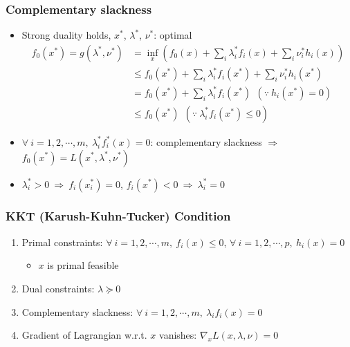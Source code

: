 \subsubsection*{Complementary slackness}
\begin{itemize}
    \item Strong duality holds, $x^\ast$, $\lambda^\ast$, $\nu^\ast$: optimal
    \begin{equation}\begin{aligned}
        f_0(x^\ast)=g(\lambda^\ast,\nu^\ast) &= \inf_{x} \left(f_0(x)+\sum_{i}\lambda_i^\ast f_i(x)+\sum_i \nu_i^\ast h_i(x)\right) \\
            &\leq f_0(x^\ast)+\sum_{i}\lambda_i^\ast f_i(x^\ast)+\sum_i \nu_i^\ast h_i(x^\ast) \\
            &= f_0(x^\ast)+\sum_{i}\lambda_i^\ast f_i(x^\ast)~~(\because~h_i(x^\ast)=0) \\
            &\leq f_0(x^\ast)~~(\because~\lambda_i^\ast f_i(x^\ast)\leq 0)
    \end{aligned}\end{equation}
    \item $\forall~i=1,2,\cdots,m,~\lambda_i^\ast f_i^\ast(x) = 0$: complementary slackness $\Rightarrow$ $f_0(x^\ast) = L(x^\ast,\lambda^\ast,\nu^\ast)$
    \item $\lambda_i^\ast>0~\Rightarrow~f_i(x_i^\ast)=0$, $f_i(x^\ast)<0~\Rightarrow~\lambda_i^\ast=0$
\end{itemize}
\newpage

\subsubsection*{KKT (Karush-Kuhn-Tucker) Condition}
\begin{enumerate}
    \item Primal constraints: $\forall~i=1,2,\cdots,m,~f_i(x)\leq 0$, $\forall~i=1,2,\cdots,p,~h_i(x)=0$
    \begin{itemize}
        \item $x$ is primal feasible
    \end{itemize}
    \item Dual constraints: $\lambda\succeq 0$
    \item Complementary slackness: $\forall~i=1,2,\cdots,m,~\lambda_i f_i(x) = 0$
    \item Gradient of Lagrangian w.r.t. $x$ vanishes: $\nabla_x L(x,\lambda,\nu) = 0$
\end{enumerate}

